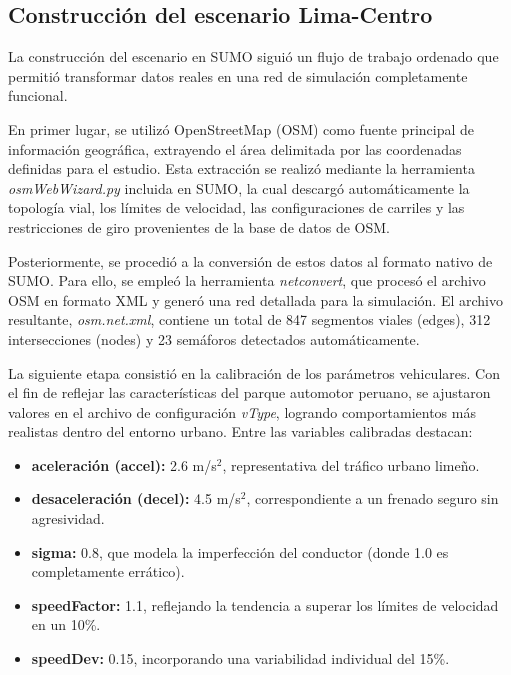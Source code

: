 \documentclass[12pt,a4paper,oneside]{report}
\begin{document}
\subsection{Construcción del escenario Lima-Centro}\label{construcciuxf3n-del-escenario-lima-centro}

La construcción del escenario en SUMO siguió un flujo de trabajo ordenado que permitió transformar datos reales en una red de simulación completamente funcional.

En primer lugar, se utilizó OpenStreetMap (OSM) como fuente principal de información geográfica, extrayendo el área delimitada por las coordenadas definidas para el estudio. Esta extracción se realizó mediante la herramienta \emph{osmWebWizard.py} incluida en SUMO, la cual descargó automáticamente la topología vial, los límites de velocidad, las configuraciones de carriles y las restricciones de giro provenientes de la base de datos de OSM.

Posteriormente, se procedió a la conversión de estos datos al formato nativo de SUMO. Para ello, se empleó la herramienta \emph{netconvert}, que procesó el archivo OSM en formato XML y generó una red detallada para la simulación. El archivo resultante, \emph{osm.net.xml}, contiene un total de 847 segmentos viales (edges), 312 intersecciones (nodes) y 23 semáforos detectados automáticamente.

La siguiente etapa consistió en la calibración de los parámetros vehiculares. Con el fin de reflejar las características del parque automotor peruano, se ajustaron valores en el archivo de configuración \emph{vType}, logrando comportamientos más realistas dentro del entorno urbano. Entre las variables calibradas destacan:

\begin{itemize}
\item
  \textbf{aceleración (accel):} 2.6 m/s\ensuremath{^{2}}, representativa del tráfico urbano limeño.
\item
  \textbf{desaceleración (decel):} 4.5 m/s\ensuremath{^{2}}, correspondiente a un frenado seguro sin agresividad.
\item
  \textbf{sigma:} 0.8, que modela la imperfección del conductor (donde 1.0 es completamente errático).
\item
  \textbf{speedFactor:} 1.1, reflejando la tendencia a superar los límites de velocidad en un 10\%.
\item
  \textbf{speedDev:} 0.15, incorporando una variabilidad individual del 15\%.
\end{itemize}
\end{document}
